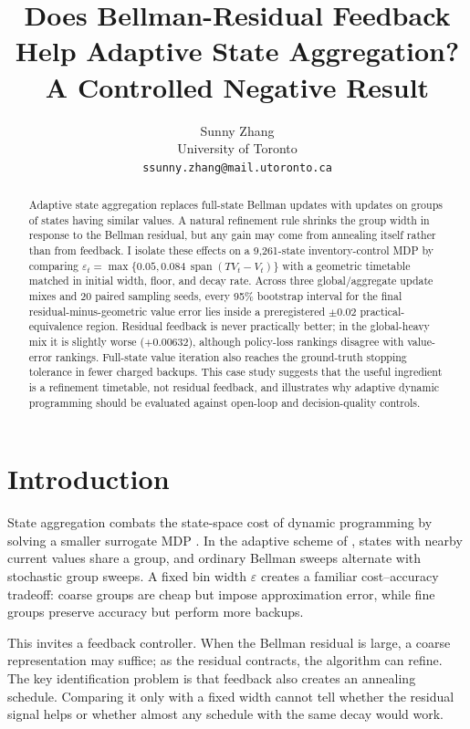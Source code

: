 \documentclass{article}
\title{Does Bellman-Residual Feedback Help Adaptive State Aggregation?\\
A Controlled Negative Result}
\author{%
  Sunny Zhang\\
  University of Toronto\\
  \texttt{ssunny.zhang@mail.utoronto.ca}
}
\begin{document}
\maketitle

\begin{abstract}
Adaptive state aggregation replaces full-state Bellman updates with updates on
groups of states having similar values.  A natural refinement rule shrinks the
group width in response to the Bellman residual, but any gain may come from
annealing itself rather than from feedback.  I isolate these effects on a
9,261-state inventory-control MDP by comparing
$\varepsilon_t=\max\{0.05,0.084\,\operatorname{span}(TV_t-V_t)\}$ with a
geometric timetable matched in initial width, floor, and decay rate.  Across
three global/aggregate update mixes and 20 paired sampling seeds, every 95\%
bootstrap interval for the final residual-minus-geometric value error lies
inside a preregistered $\pm0.02$ practical-equivalence region.  Residual
feedback is never practically better; in the global-heavy mix it is slightly
worse ($+0.00632$), although policy-loss rankings disagree with value-error
rankings.  Full-state value iteration also reaches the ground-truth stopping
tolerance in fewer charged backups.  This case study suggests that the useful
ingredient is a refinement timetable, not residual feedback, and illustrates
why adaptive dynamic programming should be evaluated against open-loop and
decision-quality controls.
\end{abstract}

\section{Introduction}

State aggregation combats the state-space cost of dynamic programming by
solving a smaller surrogate MDP \citep{whitt1978,bertsekas1989,li2006}.  In the
adaptive scheme of \citet{chen2021}, states with nearby current values share a
group, and ordinary Bellman sweeps alternate with stochastic group sweeps.  A
fixed bin width $\varepsilon$ creates a familiar cost--accuracy tradeoff: coarse
groups are cheap but impose approximation error, while fine groups preserve
accuracy but perform more backups.

This invites a feedback controller.  When the Bellman residual is large, a
coarse representation may suffice; as the residual contracts, the algorithm
can refine.  The key identification problem is that feedback also creates an
annealing schedule.  Comparing it only with a fixed width cannot tell whether
the residual signal helps or whether almost any schedule with the same decay
would work.
\end{document}
